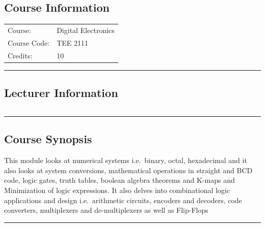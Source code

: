 
\subsection*{Course Information}\label{course:5111}
\vspace{0ex}%
\noindent\parbox{0.5\textwidth}{%
    \noindent\begin{tabular}{@{}ll}
                 \textsf{Course:}          & 	Digital Electronics \\
                 \textsf{Course Code:}         & 	TEE 2111    \\
                 \textsf{Credits:}    & 	10
    \end{tabular}}
\vspace{2ex}\hrule\vspace{2ex}

\subsection*{Lecturer Information}
\noindent\parbox{0.5\textwidth}{%
    \noindent\begin{tabular}{@{}ll}
                 
    \end{tabular}}
\vspace{2ex}\hrule\vspace{2ex}


\subsection*{Course Synopsis}
This module looks at numerical systems i.e.\ binary, octal, hexadecimal and it also looks at system conversions, mathematical operations in straight and BCD code, logic gates, truth tables, boolean algebra  theorems and K-maps and Minimization of logic expressions.
It also delves into combinational logic applications and design i.e.\ arithmetic circuits, encoders and decoders, code converters, multiplexers and de-multiplexers as well as Flip-Flops
\vspace{2ex} \hrule\vspace{2ex}

